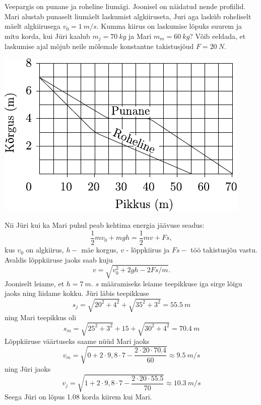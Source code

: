 
Veepargis on punane ja roheline liumägi. Joonisel on näidatud nende profiilid. Mari alustab punaselt liumäelt laskumist algkiiruseta, Juri aga lasküb roheliselt mäelt algkiirusega $v_0 = \SI{1}{m/s}$. Kumma kiirus on laskumise lõpuks suurem ja mitu korda, kui Jüri kaalub $m_j = \SI{70}{kg}$ ja Mari $m_m = \SI{60}{kg}$? Võib eeldada, et laskumise ajal mõjub neile mõlemale konstantne takistusjõud $F = \SI{20}{N}$.
\begin{center}
	\includegraphics[width=0.7\linewidth]{2004-v3g-02-yl.pdf}
\end{center}

\hint

\solu
Nii Jüri kui ka Mari puhul peab kehtima energia jäävuse seadus:
$$
\frac{1}{2} m v_{0}+m g h=\frac{1}{2} m v+F s,
$$
kus $v_{0}$ on algkiirus, $h-$ mäe korgus, $v$ - lõppkiirus ja $F s-$ töö takistusjõu vastu. Avaldis lõppkiiruse jaoks saab kuju
$$
v=\sqrt{v_{0}^{2}+2 g h-2 F s / m}.
$$
Jooniselt leiame, et $h=\SI{7}{m}$. $s$ määramiseks leiame teepikkuse iga sirge lõigu jaoks ning liidame kokku. Jüri läbis teepikkuse
$$
s_{j}=\sqrt{20^{2}+4^{2}}+\sqrt{35^{2}+3^{2}}=\SI{55,5}{m}
$$
ning Mari teepikkus oli
$$
s_{m}=\sqrt{25^{2}+3^{2}}+15+\sqrt{30^{2}+4^{2}}=\SI{70,4}{m}
$$
Lõppkiiruse väärtuseks saame nüüd Mari jaoks
$$
v_{m}=\sqrt{0+2 \cdot 9,8 \cdot 7-\frac{2 \cdot 20 \cdot \num{70,4}}{60}} \approx \SI{9,5}{m/s}
$$
ning Jüri jaoks
$$
v_{j}=\sqrt{1+2 \cdot 9,8 \cdot 7-\frac{2 \cdot 20 \cdot \num{55,5}}{70}} \approx \SI{10,3}{m/s}
$$
Seega Jüri on lõpus \num{1,08} korda kiirem kui Mari.

\probend